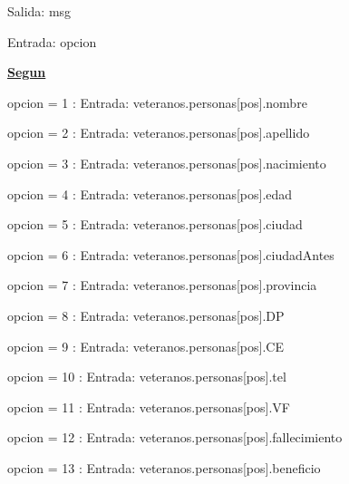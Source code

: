 \documentclass{article}
\begin{document}
                \hspace{16mm} Salida: msg

                \hspace{16mm}Entrada: opcion

                \hspace{16mm}\underline{\textbf{Segun}}

                    \hspace{20mm}opcion = 1 : Entrada: veteranos.personas[pos].nombre

                    \hspace{20mm}opcion = 2 : Entrada: veteranos.personas[pos].apellido
                    
                    \hspace{20mm}opcion = 3 : Entrada: veteranos.personas[pos].nacimiento
                    
                    \hspace{20mm}opcion = 4 : Entrada: veteranos.personas[pos].edad
                    
                    \hspace{20mm}opcion = 5 : Entrada: veteranos.personas[pos].ciudad
                    
                    \hspace{20mm}opcion = 6 : Entrada: veteranos.personas[pos].ciudadAntes

                    \hspace{20mm}opcion = 7 : Entrada: veteranos.personas[pos].provincia

                    \hspace{20mm}opcion = 8 : Entrada: veteranos.personas[pos].DP
                    
                    \hspace{20mm}opcion = 9 : Entrada: veteranos.personas[pos].CE
                    
                    \hspace{20mm}opcion = 10 : Entrada: veteranos.personas[pos].tel
                    
                    \hspace{20mm}opcion = 11 : Entrada: veteranos.personas[pos].VF
                    
                    \hspace{20mm}opcion = 12 : Entrada: veteranos.personas[pos].fallecimiento

                    \hspace{20mm}opcion = 13 : Entrada: veteranos.personas[pos].beneficio
\end{document}

